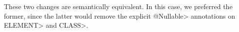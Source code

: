 \noindent
These two changes are semantically equivalent.  In this case, we preferred
the former, since the latter would remove the explicit \<@Nullable>
annotations on \<ELEMENT> and \<CLASS>.


